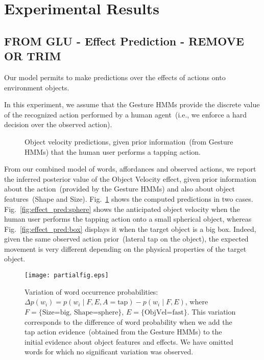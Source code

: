 
\section{Experimental Results}

\subsection{FROM GLU - Effect Prediction - REMOVE OR TRIM}

Our model permits to make predictions over the effects of actions onto environment objects.

In this experiment, we assume that the Gesture \acp{HMM} provide the discrete value of the recognized action performed by a human agent~(i.e., we enforce a hard decision over the observed action).

\begin{figure}
    \centering
     \quad
    \caption{Object velocity predictions, given prior information~(from Gesture \acp{HMM}) that the human user performs a tapping action.}
    \label{fig:effect_pred}
\end{figure}


From our combined model of words, affordances and observed actions, we report the inferred posterior value of the Object Velocity effect, given prior information about the action~(provided by the Gesture \acp{HMM}) and also about object features~(Shape and Size). Fig.~\ref{fig:effect_pred} shows the computed predictions in two cases. Fig.~\ref{fig:effect_pred:sphere} shows the anticipated object velocity when the human user performs the tapping action onto a small spherical object, whereas Fig.~\ref{fig:effect_pred:box} displays it when the target object is a big box. Indeed, given the same observed action prior~(lateral tap on the object), the expected movement is very different depending on the physical properties of the target object.

\begin{figure}
\centering
\texttt{[image: partialfig.eps]}
\caption{Variation of word occurrence probabilities: $\Delta p(w_i) = p(w_i \mid F, E, A=\text{tap}) - p(w_i \mid F,E)$, where $F = \{\text{Size=big, Shape=sphere}\}$, $E = \{\text{ObjVel=fast}\}$. This variation corresponds to the difference of word probability when we add the tap action evidence~(obtained from the Gesture \acp{HMM}) to the initial evidence about object features and effects. We have omitted words for which no significant variation was observed.}
\label{fig:probdiff}
\end{figure}

